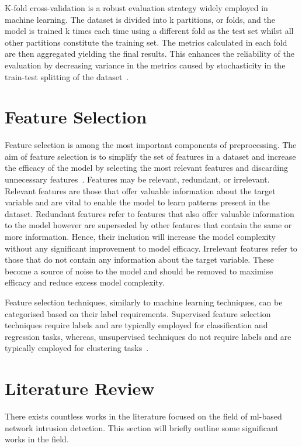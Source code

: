K-fold cross-validation is a robust evaluation strategy widely employed in
machine learning. The dataset is divided into k partitions, or folds, and the
model is trained k times each time using a different fold as the test set
whilst all other partitions constitute the training set. The metrics calculated
in each fold are then aggregated yielding the final results. This enhances the
reliability of the evaluation by decreasing variance in the metrics caused by
stochasticity in the train-test splitting of the dataset~\cite{kfoldcv}.

\section{Feature Selection}%
\label{sec:feat_eng}
Feature selection is among the most important components of preprocessing.
The aim of feature selection is to simplify the set of features in a dataset and
increase the efficacy of the model by selecting the most relevant features and
discarding unnecessary features~\cite{feat-sel}. Features may be relevant,
redundant, or irrelevant. Relevant features are those that offer valuable
information about the target variable and are vital to enable the model to
learn patterns present in the dataset. Redundant features refer to features
that also offer valuable information to the model however are superseded by
other features that contain the same or more information. Hence, their
inclusion will increase the model complexity without any significant
improvement to model efficacy. Irrelevant features refer to those that do not
contain any information about the target variable. These become a source of
noise to the model and should be removed to maximise efficacy and reduce excess
model complexity.

Feature selection techniques, similarly to machine learning techniques, can be
categorised based on their label requirements. Supervised feature selection
techniques require labels and are typically employed for classification and
regression tasks, whereas, unsupervised techniques do not require labels and
are typically employed for clustering tasks~\cite{feat-sel}.

\section{Literature Review}%
\label{sec:literature}

There exists countless works in the literature focused on the field of
\gls{ml}-based network intrusion detection. This section will briefly outline
some significant works in the field.

